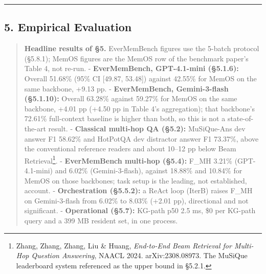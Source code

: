 \documentclass[
]{article}
\begin{document}
\begin{center}\rule{0.5\linewidth}{0.5pt}\end{center}

\subsection{5. Empirical Evaluation}\label{empirical-evaluation}

\begin{quote}
\textbf{Headline results of §5.} EverMemBench figures use the 5-batch
protocol (§5.8.1); MemOS figures are the MemOS row of the benchmark
paper's Table 4, not re-run. - \textbf{EverMemBench, GPT-4.1-mini
(§5.1.6):} Overall 51.68\% (95\% CI {[}49.87, 53.48{]}) against 42.55\%
for MemOS on the same backbone, +9.13 pp. - \textbf{EverMemBench,
Gemini-3-flash (§5.1.10):} Overall 63.28\% against 59.27\% for MemOS on
the same backbone, +4.01 pp (+4.50 pp in Table 4's aggregation); that
backbone's 72.61\% full-context baseline is higher than both, so this is
not a state-of-the-art result. - \textbf{Classical multi-hop QA (§5.2):}
MuSiQue-Ans dev answer F1 58.62\% and HotPotQA dev distractor answer F1
73.37\%, above the conventional reference readers and about 10--12 pp
below Beam Retrieval\footnote{Zhang, Zhang, Zhang, Liu \& Huang,
  \emph{End-to-End Beam Retrieval for Multi-Hop Question Answering},
  NAACL 2024. arXiv:2308.08973. The MuSiQue leaderboard system
  referenced as the upper bound in §5.2.1.}. - \textbf{EverMemBench
multi-hop (§5.4):} F\_MH 3.21\% (GPT-4.1-mini) and 6.02\%
(Gemini-3-flash), against 18.88\% and 10.84\% for MemOS on those
backbones; task setup is the leading, not established, account. -
\textbf{Orchestration (§5.5.2):} a ReAct loop (IterB) raises F\_MH on
Gemini-3-flash from 6.02\% to 8.03\% (+2.01 pp), directional and not
significant. - \textbf{Operational (§5.7):} KG-path p50 2.5 ms, \$0 per
KG-path query and a 399 MB resident set, in one process.
\end{quote}
\end{document}
